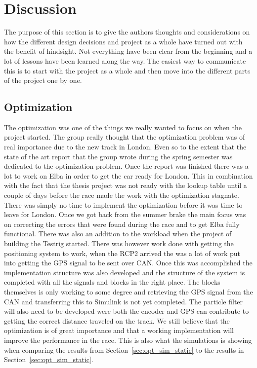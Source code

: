 \chapter{Discussion}
The purpose of this section is to give the authors thoughts and considerations
on how the different design decisions and project as a whole have turned out
with the benefit of hindsight. Not everything have been clear from the beginning
and a lot of lessons have been learned along the way. The easiest way to
communicate this is to start with the project as a whole and then move into the
different parts of the project one by one. 
\section{Optimization}
The optimization was one of the things we really wanted to focus on when the
project started. The group really thought that the optimization problem was of
real importance due to the new track in London. Even so to the extent that the
state of the art report that the group wrote during the spring semester was
dedicated to the optimization problem. Once the report was finished there was a
lot to work on Elba in order to get the car ready for London. This in
combination with the fact that the thesis project was not ready with the lookup
table until a couple of days before the race made the work with the optimization
stagnate. There was simply no time to implement the optimization before it was
time to leave for London. Once we got back from the summer brake the main focus
was on correcting the errors that were found during the race and to get Elba
fully functional. There was also an addition to the workload when the project of
building the Testrig started. There was however work done with getting the
positioning system to work, when the RCP2 arrived the was a lot of work put into
getting the GPS signal to be sent over CAN\@. Once this was accomplished the
implementation structure was also developed and the structure of the system is
completed with all the signals and blocks in the right place.  The blocks
themselves is only working to some degree and retrieving the GPS signal from the
CAN and transferring this to Simulink is not yet completed. The particle filter
will also need to be developed were both the encoder and GPS can contribute to
getting the correct distance traveled on the track. We still believe that the
optimization is of great importance and that a working implementation will
improve the performance in the race. This is also what the simulations is
showing when comparing the results from Section~\ref{sec:opt_sim_static} to the
results in Section~\ref{sec:opt_sim_static}.
